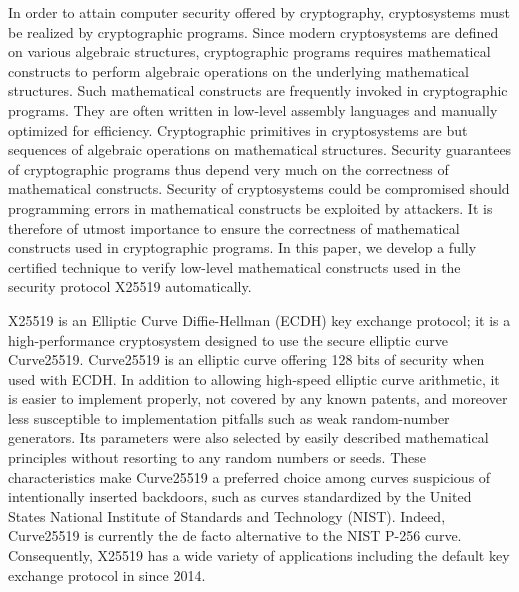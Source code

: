 
In order to attain computer security offered by cryptography,
cryptosystems must be realized by cryptographic programs. Since modern
cryptosystems are defined on various algebraic structures,
cryptographic programs requires mathematical constructs to perform
algebraic operations on the underlying mathematical structures.
Such mathematical constructs are frequently invoked in cryptographic
programs. They are often written in low-level assembly languages and
manually optimized for efficiency. Cryptographic primitives in
cryptosystems are but sequences of algebraic operations on
mathematical structures. Security guarantees of cryptographic programs
thus depend very much on the correctness of mathematical constructs.
Security of cryptosystems could be compromised should programming
errors in mathematical constructs be exploited by attackers. 
It is therefore of utmost importance to ensure the correctness of
mathematical constructs used in cryptographic programs. In this paper,
we develop a fully certified technique to verify low-level
mathematical constructs used in the security protocol X25519
automatically.

X25519 is an Elliptic Curve Diffie-Hellman (ECDH) key exchange
protocol; it is a high-performance cryptosystem designed to 
use the secure elliptic curve Curve25519. Curve25519 is an elliptic
curve offering 128 bits of security when used with ECDH. In addition
to allowing high-speed elliptic curve arithmetic, it is easier to
implement properly, not covered by any known patents, and moreover
less susceptible to implementation pitfalls such as weak 
random-number generators. Its parameters were also selected by
easily described mathematical principles without resorting to any
random numbers or seeds. These characteristics make Curve25519 a
preferred choice among curves suspicious of intentionally inserted
backdoors, such as curves standardized by the United States National
Institute of Standards and Technology (NIST). 
Indeed, Curve25519 is currently the
de facto alternative to the NIST P-256 curve. Consequently, X25519 has
a wide variety of applications including the default key exchange
protocol in \openssh since 2014.

